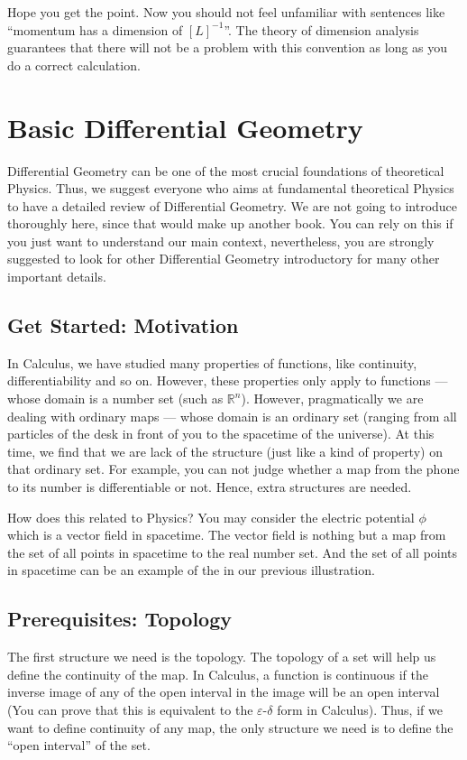 \documentclass[letterpaper,10pt,english]{sphinxmanual}
\begin{document}
Hope you get the point. Now you should not feel unfamiliar with sentences like “momentum has a dimension of \([L]^{-1}\)”. The theory of dimension analysis guarantees that there will not be a problem with this convention as long as you do a correct calculation.


\section{Basic Differential Geometry}
\label{\detokenize{bg_diff_geo::doc}}\label{\detokenize{bg_diff_geo:basic-differential-geometry}}
Differential Geometry can be one of the most crucial foundations of theoretical Physics. Thus, we suggest everyone who aims at fundamental theoretical Physics to have a detailed review of Differential Geometry. We are not going to introduce thoroughly here, since that would make up another book. You can rely on this if you just want to understand our main context, nevertheless, you are strongly suggested to look for other Differential Geometry introductory for many other important details.


\subsection{Get Started: Motivation}
\label{\detokenize{bg_diff_geo:get-started-motivation}}
In Calculus, we have studied many properties of functions, like continuity, differentiability and so on. However, these properties only apply to functions — whose domain is a number set (such as \(\mathbb R^n\)). However, pragmatically we are dealing with ordinary maps — whose domain is an ordinary set (ranging from all particles of the desk in front of you to the spacetime of the universe). At this time, we find that we are lack of the structure (just like a kind of property) on that ordinary set. For example, you can not judge whether a map from the phone to its number is differentiable or not. Hence, extra structures are needed.

How does this related to Physics? You may consider the electric potential \(\phi\) which is a vector field in spacetime. The vector field is nothing but a map from the set of all points in spacetime to the real number set. And the set of all points in spacetime can be an example of the  in our previous illustration.


\subsection{Prerequisites: Topology}
\label{\detokenize{bg_diff_geo:prerequisites-topology}}
The first structure we need is the topology. The topology of a set will help us define the continuity of the map. In Calculus, a function is continuous if the inverse image of any of the open interval in the image will be an open interval (You can prove that this is equivalent to the \(\varepsilon\)-\(\delta\) form in Calculus). Thus, if we want to define continuity of any map, the only structure we need is to define the “open interval” of the set.
\end{document}
